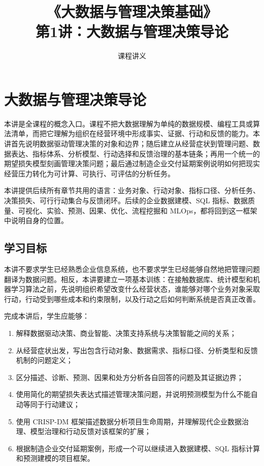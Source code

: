 \documentclass[UTF8,fontset=fandol,openany,zihao=-4]{ctexbook}
\title{《大数据与管理决策基础》\\[0.5em]\large 第1讲：大数据与管理决策导论}
\author{课程讲义}
\date{}
\begin{document}
\maketitle
\tableofcontents

\setcounter{chapter}{0}
\chapter{大数据与管理决策导论}
\label{ch:week01-intro}

\begin{chapterbox}
本讲是全课程的概念入口。课程不把大数据理解为单纯的数据规模、编程工具或算法清单，而把它理解为组织在经营环境中形成事实、证据、行动和反馈的能力。本讲首先说明数据驱动管理决策的对象和边界；随后建立从经营症状到管理问题、数据表达、指标体系、分析模型、行动选择和反馈治理的基本链条；再用一个统一的期望损失模型刻画管理决策问题；最后通过制造企业交付延期案例说明如何把现实经营压力转化为可计算、可执行、可评估的分析任务。
\end{chapterbox}

\begin{modernbox}[课程接口]
本讲提供后续所有章节共用的语言：业务对象、行动对象、指标口径、分析任务、决策损失、可行行动集合与反馈闭环。后续的企业数据建模、SQL 指标、数据质量、可视化、实验、预测、因果、优化、流程挖掘和 MLOps，都将回到这一框架中说明自身的位置。
\end{modernbox}

\section{学习目标}

本讲不要求学生已经熟悉企业信息系统，也不要求学生已经能够自然地把管理问题翻译为数据问题。相反，本讲要建立一项基本训练：在接触数据库、统计模型和机器学习算法之前，先说明组织希望改变什么经营状态，谁能够对哪个业务对象采取行动，行动受到哪些成本和约束限制，以及行动之后如何判断系统是否真正改善。

完成本讲后，学生应能够：
\begin{enumerate}
  \item 解释数据驱动决策、商业智能、决策支持系统与决策智能之间的关系；
  \item 从经营症状出发，写出包含行动对象、数据需求、指标口径、分析类型和反馈机制的问题定义；
  \item 区分描述、诊断、预测、因果和处方分析各自回答的问题及其证据边界；
  \item 使用简化的期望损失表达式描述管理决策问题，并说明预测模型为什么不能自动等同于行动建议；
  \item 使用 CRISP-DM 框架描述数据分析项目生命周期，并理解现代企业数据治理、模型治理和行动反馈对该框架的扩展；
  \item 根据制造企业交付延期案例，形成一个可以继续进入数据建模、SQL 指标计算和预测建模的项目框架。
\end{enumerate}
\end{document}
